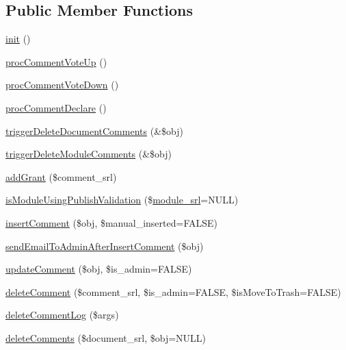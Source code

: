 \subsection*{Public Member Functions}
\begin{DoxyCompactItemize}
\item 
\hyperlink{classcommentController_aee7912001fe1896ca5440d22b42c626d}{init} ()
\item 
\hyperlink{classcommentController_a1ca216be683b8cedf6b5f71aaa23a0b3}{proc\+Comment\+Vote\+Up} ()
\item 
\hyperlink{classcommentController_ae5c2ce138a0c36f2d7fb4f1fdcfad800}{proc\+Comment\+Vote\+Down} ()
\item 
\hyperlink{classcommentController_af2d31904b424b330a3f2710c16d55f7b}{proc\+Comment\+Declare} ()
\item 
\hyperlink{classcommentController_ab209ef386bfb83c88a85bf4618237aca}{trigger\+Delete\+Document\+Comments} (\&\$obj)
\item 
\hyperlink{classcommentController_a8c9ad7337a8522f82a4010f9f0afa274}{trigger\+Delete\+Module\+Comments} (\&\$obj)
\item 
\hyperlink{classcommentController_a429acbf0d176d50256f666ecf9364aa8}{add\+Grant} (\$comment\+\_\+srl)
\item 
\hyperlink{classcommentController_ad77fc43c9ea8beb6397d541f8ff44f93}{is\+Module\+Using\+Publish\+Validation} (\$\hyperlink{ko_8install_8php_a370bb6450fab1da3e0ed9f484a38b761}{module\+\_\+srl}=N\+U\+L\+L)
\item 
\hyperlink{classcommentController_adf4259b95832275119add098174c8816}{insert\+Comment} (\$obj, \$manual\+\_\+inserted=F\+A\+L\+S\+E)
\item 
\hyperlink{classcommentController_a36736562b092a021301ec11a61310e68}{send\+Email\+To\+Admin\+After\+Insert\+Comment} (\$obj)
\item 
\hyperlink{classcommentController_aa2a123794691f3e5153f4df0b03c318f}{update\+Comment} (\$obj, \$is\+\_\+admin=F\+A\+L\+S\+E)
\item 
\hyperlink{classcommentController_adfd7bfdb249d109119f85e72aca2253c}{delete\+Comment} (\$comment\+\_\+srl, \$is\+\_\+admin=F\+A\+L\+S\+E, \$is\+Move\+To\+Trash=F\+A\+L\+S\+E)
\item 
\hyperlink{classcommentController_adc42c2f7d0cc2406cf38934bd38584ba}{delete\+Comment\+Log} (\$args)
\item 
\hyperlink{classcommentController_a40b5ccce875c41ce902c82ec622c938e}{delete\+Comments} (\$document\+\_\+srl, \$obj=N\+U\+L\+L)

\end{DoxyCompactItemize}

